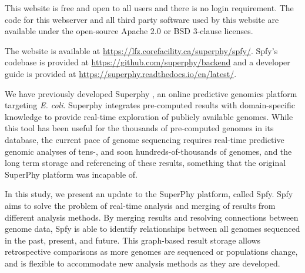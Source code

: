 


This website is free and open to all users and there is no login requirement. The code for this webserver and all third party software used by this website are available under the open-source Apache 2.0 or BSD 3-clause licenses.

The website is available at \url{https://lfz.corefacility.ca/superphy/spfy/}. Spfy's codebase is provided at \url{https://github.com/superphy/backend} and a developer guide is provided at \url{https://superphy.readthedocs.io/en/latest/}.

We have previously developed Superphy \citep{whiteside2016superphy}, an online predictive genomics platform targeting \textit{E. coli}. Superphy integrates pre-computed results with domain-specific knowledge to provide real-time exploration of publicly available genomes. While this tool has been useful for the thousands of pre-computed genomes in its database, the current pace of genome sequencing requires real-time predictive genomic analyses of tens-, and soon hundreds-of-thousands of genomes, and the long term storage and referencing of these results, something that the original SuperPhy platform was incapable of.

In this study, we present an update to the SuperPhy platform, called Spfy. Spfy aims to solve the problem of real-time analysis and merging of results from different analysis methods. By merging results and resolving connections between genome data, Spfy is able to identify relationships between all genomes sequenced in the past, present, and future. This graph-based result storage allows retrospective comparisons as more genomes are sequenced or populations change, and is flexible to accommodate new analysis methods as they are developed.

